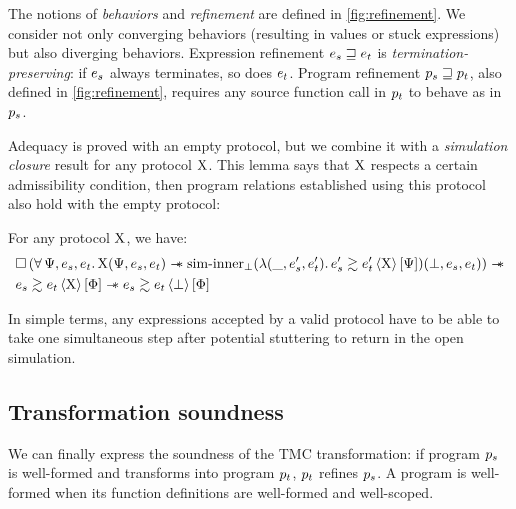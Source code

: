 The notions of \emph{behaviors} and \emph{refinement} are defined in \cref{fig:refinement}.
We consider not only converging behaviors (resulting in values or stuck expressions) but also diverging behaviors.
Expression refinement $\datalangExpr_s \refined \datalangExpr_t$ is \emph{termination-preserving}: if $\datalangExpr_s$ always terminates, so does $\datalangExpr_t$.
Program refinement $\datalangProg_s \refined \datalangProg_t$, also defined in \cref{fig:refinement}, requires any source function call in $\datalangProg_t$ to behave as in $\datalangProg_s$.

Adequacy is proved with an empty protocol, but we combine it with a \emph{simulation closure} result for any protocol $\mathrm{X}$. This lemma says that $\mathrm{X}$ respects a certain admissibility condition, then program relations established using this protocol also hold with the empty protocol:
\begin{lemma}
\label{lem:closure}
  For any protocol $\mathrm{X}$, we have:
    \begin{align*}
            &
            \iPersistent \left(
                \forall \iPredTwo, \datalangExpr_s, \datalangExpr_t \ldotp
                \iProt (\iPredTwo, \datalangExpr_s, \datalangExpr_t) \iWand
                \mathrm{sim \mathhyphen inner}_\bot (\lambdaAbs (\_, \datalangExpr_s', \datalangExpr_t') \ldotp \iSim[\iProt]{\iPredTwo}{\datalangExpr_s'}{\datalangExpr_t'}) (\bot, \datalangExpr_s, \datalangExpr_t)
            \right) \iWand
        \\
            &
            \iSim[\iProt]{\iPred}{\datalangExpr_s}{\datalangExpr_t} \iWand
            \iSim[\bot]{\iPred}{\datalangExpr_s}{\datalangExpr_t}
    \end{align*}
\end{lemma}

In simple terms, any expressions accepted by a valid protocol have to be able to take one simultaneous step after potential stuttering to return in the open simulation.

\subsection{Transformation soundness}

We can finally express the soundness of the TMC transformation: if program $\datalangProg_s$ is well-formed and transforms into program $\datalangProg_t$, $\datalangProg_t$ refines $\datalangProg_s$.
A program is well-formed when its function definitions are well-formed and well-scoped.

